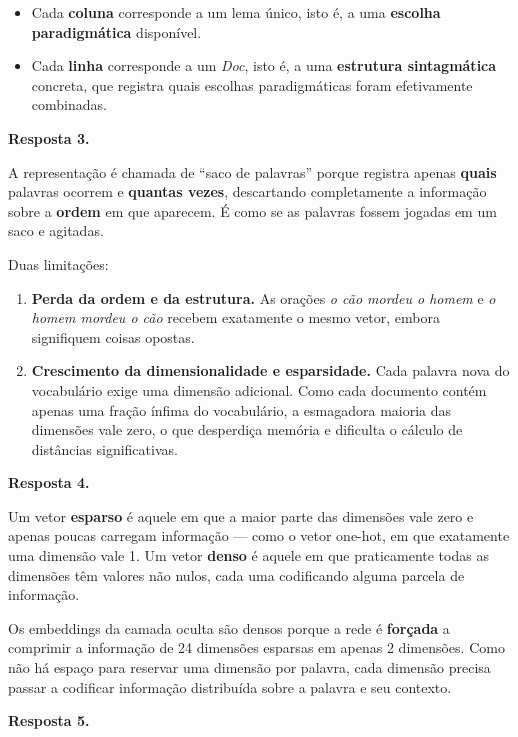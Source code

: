 \documentclass[
  brazilian,
]{article}
\providecommand{\tightlist}{%
  \setlength{\itemsep}{0pt}\setlength{\parskip}{0pt}}
\begin{document}
\begin{itemize}
\tightlist
\item
  Cada \textbf{coluna} corresponde a um lema único, isto é, a uma
  \textbf{escolha paradigmática} disponível.
\item
  Cada \textbf{linha} corresponde a um \emph{Doc}, isto é, a uma
  \textbf{estrutura sintagmática} concreta, que registra quais escolhas
  paradigmáticas foram efetivamente combinadas.
\end{itemize}

\textbf{Resposta 3.}

A representação é chamada de ``saco de palavras'' porque registra apenas
\textbf{quais} palavras ocorrem e \textbf{quantas vezes}, descartando
completamente a informação sobre a \textbf{ordem} em que aparecem. É
como se as palavras fossem jogadas em um saco e agitadas.

Duas limitações:

\begin{enumerate}
\def\labelenumi{\arabic{enumi}.}
\tightlist
\item
  \textbf{Perda da ordem e da estrutura.} As orações \emph{o cão mordeu
  o homem} e \emph{o homem mordeu o cão} recebem exatamente o mesmo
  vetor, embora signifiquem coisas opostas.
\item
  \textbf{Crescimento da dimensionalidade e esparsidade.} Cada palavra
  nova do vocabulário exige uma dimensão adicional. Como cada documento
  contém apenas uma fração ínfima do vocabulário, a esmagadora maioria
  das dimensões vale zero, o que desperdiça memória e dificulta o
  cálculo de distâncias significativas.
\end{enumerate}

\textbf{Resposta 4.}

Um vetor \textbf{esparso} é aquele em que a maior parte das dimensões
vale zero e apenas poucas carregam informação --- como o vetor one-hot,
em que exatamente uma dimensão vale 1. Um vetor \textbf{denso} é aquele
em que praticamente todas as dimensões têm valores não nulos, cada uma
codificando alguma parcela de informação.

Os embeddings da camada oculta são densos porque a rede é
\textbf{forçada} a comprimir a informação de 24 dimensões esparsas em
apenas 2 dimensões. Como não há espaço para reservar uma dimensão por
palavra, cada dimensão precisa passar a codificar informação distribuída
sobre a palavra e seu contexto.

\textbf{Resposta 5.}
\end{document}
